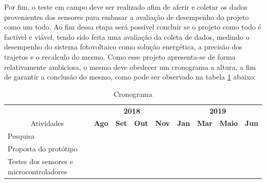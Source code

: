 Por fim, o teste em campo deve ser realizado afim de aferir e coletar os dados provenientes dos sensores para embasar a avaliação de desempenho do projeto como um todo. Ao fim dessa etapa será possível concluir se o projeto como todo é factível e viável, tendo sido feita uma avaliação da coleta de dados, medindo o desempenho do sistema fotovoltaico como solução  energética, a precisão dos trajetos e o recalculo do mesmo.
\newpage
Como esse projeto apresenta-se de forma relativamente ambiciosa, o mesmo deve obedecer um cronograma a altura, a fim de garantir a conclusão do mesmo, como pode ser observado na tabela \ref{cap:metodologia:cronograma} abaixo:
\begin{table}[h]
\centering
\caption{Cronograma}
\label{cap:metodologia:cronograma}
\begin{tabular}{|l|l|l|l|l|l|l|l|l|}
\hline
\multicolumn{1}{|c|}{}                             & \multicolumn{4}{c|}{\textbf{2018}}                                                                                                                      & \multicolumn{4}{c|}{\textbf{2019}}                                                                                                                      \\ \cline{2-9} 
\multicolumn{1}{|c|}{\multirow{-2}{*}{Atividades}} & \textbf{Ago}             & \textbf{Set}                                    & \textbf{Out}             & \textbf{Nov}                                    & \textbf{Jan}             & \textbf{Mar}                                    & \textbf{Maio}                                   & \textbf{Jun}             \\ \hline
Pesquisa                                           & \cellcolor[HTML]{000000} & \cellcolor[HTML]{000000}{\color[HTML]{000000} } & \cellcolor[HTML]{FFFFFF} &                                                 &                          &                                                 &                                                 &                          \\ \hline
Proposta do protótipo                              &                          &                                                 & \cellcolor[HTML]{000000} & \cellcolor[HTML]{000000}{\color[HTML]{000000} } &                          &                                                 &                                                 &                          \\ \hline
Testes dos sensores e microcontroladores           &                          &                                                 &                          &                                                 & \cellcolor[HTML]{000000} & \cellcolor[HTML]{FFFFFF}{\color[HTML]{000000} } &                                                 &                          \\ \hline

\end{tabular}
\end{table}
